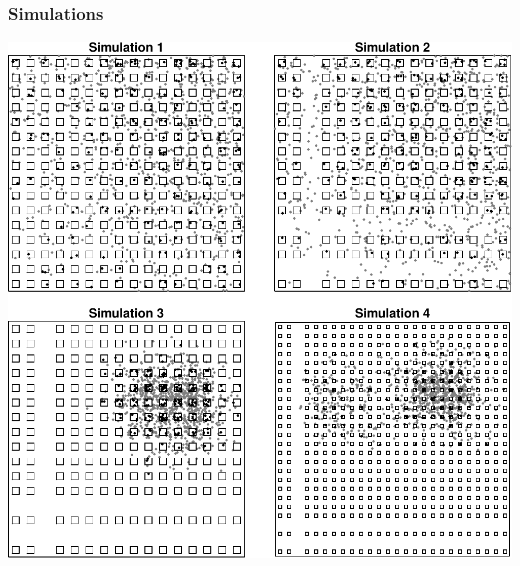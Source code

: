 \documentclass[mathserif,compress]{beamer}\usepackage{graphicx, color}
\makeatletter
\def\maxwidth{ %
  \ifdim\Gin@nat@width>\linewidth
    \linewidth
  \else
    \Gin@nat@width
  \fi
}
\makeatother
\begin{document}
\subsection{}
\begin{frame}[fragile]
\frametitle{Simulations}

\begin{center}
\includegraphics[width = .55\maxwidth]{figure/SimDataCrop}
\end{center}

\end{frame}

\end{document}
